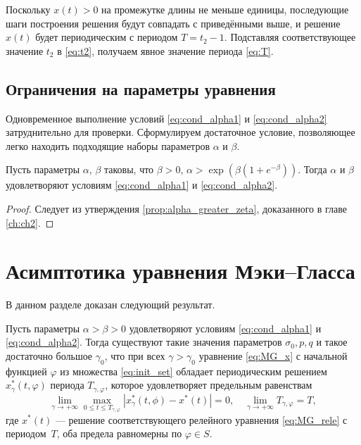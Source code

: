 Поскольку $x(t) > 0$ на промежутке длины не меньше единицы, последующие шаги построения решения будут совпадать с приведёнными выше, и решение $x(t)$ будет периодическим с периодом $T = t_2 - 1$. Подставляя соответствующее значение $t_2$ в \eqref{eq:t2}, получаем явное значение периода \eqref{eq:T}.


\subsection{Ограничения на параметры уравнения}

Одновременное выполнение условий \eqref{eq:cond_alpha1} и \eqref{eq:cond_alpha2} затруднительно для проверки. Сформулируем достаточное условие, позволяющее легко находить подходящие наборы параметров $\alpha$ и $\beta$.

\begin{theorem}
Пусть параметры $\alpha$, $\beta$ таковы, что $\beta > 0$, $\alpha > \exp\left(\beta(1 + e^{-\beta})\right)$. Тогда $\alpha$ и $\beta$ удовлетворяют условиям \eqref{eq:cond_alpha1} и \eqref{eq:cond_alpha2}.
\end{theorem}
\begin{proof}
	Следует из утверждения \ref{prop:alpha_greater_zeta}, доказанного в главе \ref{ch:ch2}.
\end{proof}

\section{Асимптотика уравнения Мэки--Гласса}

В данном разделе доказан следующий результат.

\begin{theorem}
    \label{thm:existence}
Пусть параметры $\alpha > \beta > 0$ удовлетворяют условиям \eqref{eq:cond_alpha1} и  \eqref{eq:cond_alpha2}. Тогда существуют такие значения параметров $\sigma_0, p, q$ и такое достаточно большое $\gamma_0$, что при всех $\gamma > \gamma_0$ уравнение \eqref{eq:MG_x} с начальной функцией $\varphi$ из множества \eqref{eq:init_set} обладает периодическим решением $x^*_\gamma(t, \varphi)$ периода $T_{\gamma, \varphi}$, которое удовлетворяет предельным равенствам 
\begin{equation}
\label{eq:lim_x*}
	\lim_{\gamma\to+\infty}\max_{0\leqslant t\leqslant T_{\gamma, \varphi}}|x_{\gamma}^*(t, \phi)-x^*(t)|=0,\quad \lim_{\gamma\to+\infty}T_{\gamma, \varphi} = T,
\end{equation}
где $x^*(t)$ --- решение соответствующего релейного уравнения \eqref{eq:MG_rele} с периодом~$T$, оба предела равномерны по $\varphi \in S$. 
\end{theorem}

